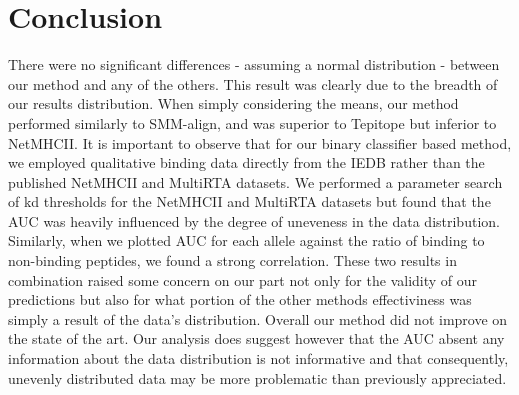 \documentclass[journal]{IEEEtran}
\begin{document}
\section{Conclusion}
There were no significant differences - assuming a normal distribution - between our method and any of the others.  This result was clearly due to the breadth of our results distribution.  When simply considering the means, our method  performed similarly to SMM-align, and was superior to Tepitope but inferior to NetMHCII.  It is important to observe that for our binary classifier based method, we employed qualitative binding data directly from the IEDB rather than the published NetMHCII and MultiRTA datasets.  We performed a parameter search of kd thresholds for the NetMHCII and MultiRTA datasets but found that the AUC was heavily influenced by the degree of uneveness in the data distribution.  Similarly, when we plotted AUC for each allele against the ratio of binding to non-binding peptides, we found a strong correlation.  These two results in combination raised some concern on our part not only for the validity of our predictions but also for what portion of the other methods effectiviness was simply a result of the data's distribution.  Overall our method did not improve on the state of the art.  Our analysis does suggest however that the AUC absent any information about the data distribution is not informative and that consequently, unevenly distributed data may be more problematic than previously appreciated.






%
\end{document}
